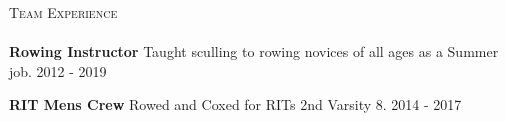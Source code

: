 \documentclass[a4paper]{article}
\newcommand{\lineunder} {
    \vspace*{-8pt} \\
    \hspace*{-18pt} \hrulefill \\
}
\newcommand{\header} [1] {
    {\hspace*{-18pt}\vspace*{6pt} \textsc{#1}}
    \vspace*{-6pt} \lineunder
}
\begin{document}


\header{Team Experience}
\textbf{Rowing Instructor}
Taught sculling to rowing novices of all ages as a Summer job. \hfill 2012 - 2019\\
\vspace*{2mm}

\textbf{RIT Men\textquotesingle{}s Crew}
Rowed and Coxed for RIT\textquotesingle{}s 2nd Varsity 8. \hfill  2014 - 2017\\
\vspace*{2mm}
\end{document}
